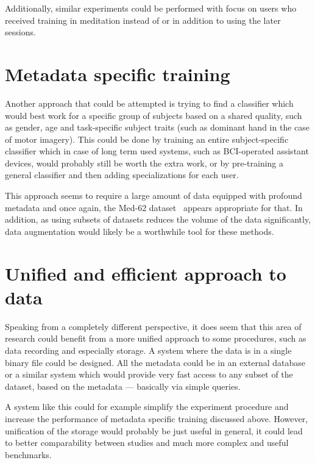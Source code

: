 \documentclass[english,BP]{thesiskiv}
\begin{document}
	Additionally, similar experiments could be performed with focus on users who received training in meditation instead of or in addition to using the later sessions.

	\section{Metadata specific training}
	
	Another approach that could be attempted is trying to find a classifier which would best work for a specific group of subjects based on a shared quality, such as gender, age and task-specific subject traits (such as dominant hand in the case of motor imagery). This could be done by training an entire subject-specific classifier which in case of long term used systems, such as BCI-operated assistant devices, would probably still be worth the extra work, or by pre-training a general classifier and then adding specializations for each user.

	This approach seems to require a large amount of data equipped with profound metadata and once again, the Med-62 dataset~\cite{stieger:data:21} appears appropriate for that. In addition, as using subsets of datasets reduces the volume of the data significantly, data augmentation would likely be a worthwhile tool for these methods.

	\section{Unified and efficient approach to data}

	Speaking from a completely different perspective, it does seem that this area of research could benefit from a more unified approach to some procedures, such as data recording and especially storage. A system where the data is in a single binary file could be designed. All the metadata could be in an external database or a similar system which would provide very fast access to any subset of the dataset, based on the metadata --- basically via simple queries.

	A system like this could for example simplify the experiment procedure and increase the performance of metadata specific training discussed above. However, unification of the storage would probably be just useful in general, it could lead to better comparability between studies and much more complex and useful benchmarks.

% 
%

{\raggedright\small

}
\end{document}
